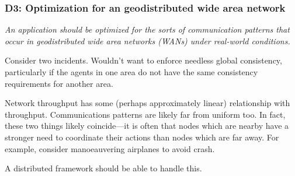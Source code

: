 \subsubsection*{D3: Optimization for an geodistributed wide area network}

\emph{An application should be optimized for the sorts of
communication patterns that occur in geodistributed wide area networks
(WANs) under real-world conditions.}

Consider two incidents. Wouldn't want to enforce needless global
consistency, particularly if the agents in one area do not have the
same consistency requirements for another area.

Network throughput has some (perhaps approximately linear)
relationship with throughput. Communications patterns are likely far
from uniform too. In fact, these two things likely coincide---it is
often that nodes which are nearby have a stronger need to coordinate
their actions than nodes which are far away. For example, consider
manoeauvering airplanes to avoid crash.

A distributed framework should be able to handle this.
